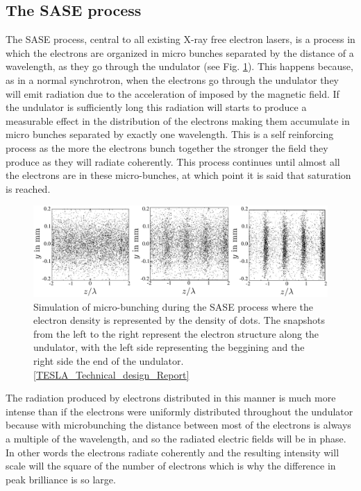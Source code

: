 \subsection{The SASE process}

The SASE process, central to all existing X-ray free electron lasers, is a
process in which the electrons are organized in micro bunches separated by the
distance of a wavelength, as they go through the undulator (see
Fig. \ref{Fig:Brilliance}). This happens because,
as in a normal synchrotron, when the electrons go through the undulator they
will emit radiation due to the acceleration of imposed by the magnetic field. If
the undulator is sufficiently long this radiation will starts to produce a
measurable effect in the distribution of the electrons making them accumulate in
micro bunches separated by exactly one wavelength. This is a self reinforcing
process as the more the electrons bunch together the stronger the field they
produce as they will radiate coherently. This process continues until almost all
the electrons are in these micro-bunches, at which point it is said that
saturation is reached. 

\begin{figure}[h]
\centering
  \includegraphics[width=1.0 \columnwidth]{micro-bunching.png}
  \caption{Simulation of micro-bunching during the SASE process where the
    electron density is represented by the density of dots. The snapshots
    from the left to the right represent the electron structure along the
    undulator, with the left side representing the beggining and the right side
    the end of the undulator. \ref{TESLA_Technical_design_Report}}
  \label{Fig:Brilliance}
\end{figure}

The radiation produced by electrons distributed in this manner is much more
intense than if the electrons were uniformly distributed throughout the
undulator because with microbunching the distance between most of the electrons is
always a multiple of the wavelength, and so the radiated electric fields will be
in phase. In other words the electrons radiate coherently and the resulting
intensity will scale will the square of the number of electrons which is why the
difference in peak brilliance is so large.

